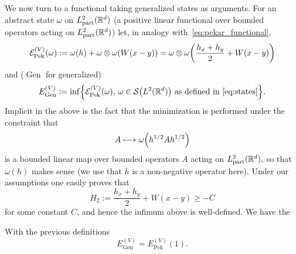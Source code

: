 \documentclass[AHL,Unicode,longabstracts,published]{cedram}
\DeclareMathOperator{\Pek}{Pek}
\DeclareMathOperator{\Genn}{Gen}
\newcommand{\cS}{\mathcal{S}}
\newcommand{\R}{\mathbb{R}}
\newcommand{\cE}{\mathcal{E}}
\newcommand{\1}{\mathds{1}}
\let\oldin\in
\renewcommand{\in}{\mathchoice{\oldin}{\oldin}{\,\oldin\,}{\,\oldin\,}}
\let\oldmapsto\mapsto
\renewcommand*{\mapsto}{\mathchoice{\longmapsto}{\oldmapsto}{\oldmapsto}{\oldmapsto}}
\let\originalleft\left
\let\originalright\right
\renewcommand{\left}{\mathopen{}\mathclose\bgroup\originalleft}
\renewcommand{\right}{\aftergroup\egroup\originalright}
\begin{document}
We now turn to a functional taking generalized states as arguments. For an abstract state $\omega$ on $L^2_{\rm part} (\R^d)$ (a positive linear functional over bounded operators acting on $L^2_{\rm part} (\R^d)$) let, in analogy with~\eqref{eq:pekar_functional},
\begin{equation*}
\cE_{\Pek}^{(V)}(\omega) := \omega (h) + \omega \otimes \omega \left(W(x-y)\right) = \omega \otimes \omega \left(\frac{h_x + h_y}{2} + W (x-y)\right)
\end{equation*}
and ($\Genn$ for generalized)
\begin{equation}\label{eq:gen ener}
E_{\Genn}^{(V)}:= \inf\left\lbrace \cE_{\Pek}^{(V)}(\omega), \, \omega \in \cS \left(L^2 (\R^d)\right) \text{ as defined in~\eqref{eq:states}}\right\rbrace.
\end{equation}
Implicit in the above is the fact that the minimization is performed under the constraint that
\[
A \mapsto \omega \left(h^{1/2} A h^{1/2} \right)
\]
is a bounded linear map over bounded operators $A$ acting on $L^2_{\rm part} (\R^d),$ so that $\omega (h)$ makes sense (we use that $h$ is a non-negative operator here). Under our assumptions one easily proves that
\begin{equation}\label{eq:two part op}
H_2:= \frac{h_x + h_y}{2} + W (x-y) \geq - C
\end{equation}
for some constant $C$, and hence the infimum above is well-defined. We have the

\begin{lemm}[{Generalized energy = Pekar energy}]\label{lem:gen ener}
With the previous definitions
\begin{equation*}
E_{\Genn}^{(V)} = E^{(V)}_{\Pek}(1).
\end{equation*}
\end{lemm}
\end{document}
